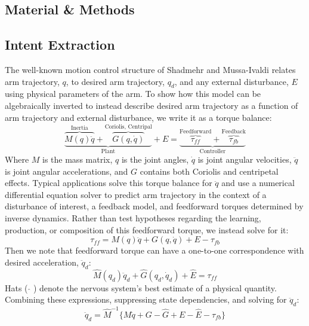 \documentclass{frontiersSCNS} %
\begin{document}
\begin{methods}
\section{Material \& Methods}

\subsection{Intent Extraction}
The well-known motion control structure of Shadmehr and Mussa-Ivaldi\cite{shadmehr1994adaptive} relates arm trajectory, $q$, to desired arm trajectory, $q_d$, and any external disturbance, $E$ using physical parameters of the arm. To show how this model can be algebraically inverted to instead describe desired arm trajectory as a function of arm trajectory and external disturbance, we write it as a torque balance:
\begin{equation}
\underbrace{\overbrace{M(q)\ddot{q}}^{\text{Inertia}}+\overbrace{G(q,\dot{q})}^{\text{Coriolis, Centripal}}}_{\text{Plant}}+E=
\underbrace{\overbrace{\tau_{ff}}^{\text{Feedforward}}+\overbrace{\tau_{fb}}^{\text{Feedback}}}_\text{Controller}
\end{equation}
Where $M$ is the mass matrix, $q$ is the joint angles, $\dot{q}$ is joint angular velocities, $\ddot{q}$ is joint angular accelerations, and $G$ contains both Coriolis and centripetal effects. Typical applications solve this torque balance for $\ddot{q}$ and use a numerical differential equation solver to predict arm trajectory in the context of a disturbance of interest, a feedback model, and feedforward torques determined by inverse dynamics. Rather than test hypotheses regarding the learning, production, or composition of this feedforward torque, we instead solve for it:
\begin{equation}
\tau_{ff}=M(q)\ddot{q}+G(q,\dot{q})+E-\tau_{fb}
\end{equation}
Then we note that feedforward torque can have a one-to-one correspondence with desired acceleration, $\ddot{q}_d$:
\begin{equation}
\hat{M}(q_d)\ddot{q}_d+\hat{G}(q_d,\dot{q}_d)+\hat{E}=\tau_{ff}
\end{equation}
Hats ( $\hat{}$ ) denote the nervous system's best estimate of a physical quantity. Combining these expressions, suppressing state dependencies, and solving for $\ddot{q}_d$:
\begin{equation}
\ddot{q}_d=\hat{M}^{-1} \{M\ddot{q}+G-\hat{G}+E-\hat{E}-\tau_{fb}\}
\end{equation}

\end{methods}
\end{document}
